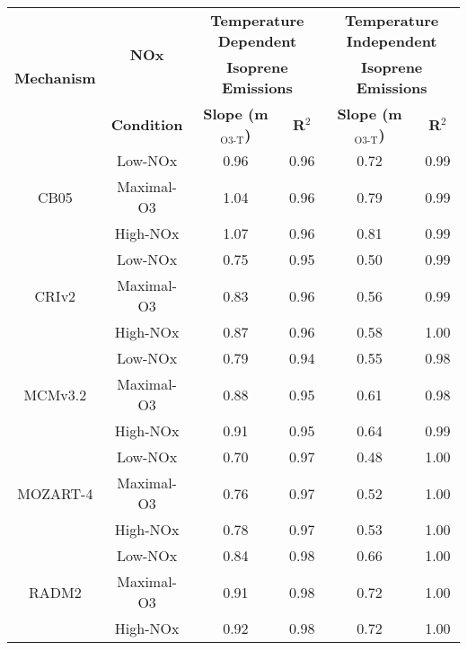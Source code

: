 {\renewcommand{\arraystretch}{1.2}
\begin{tabular}{c|c|c|c|c|c}
	\hline\hline
	\multirow{3}{*}{\textbf{Mechanism}} & \multirow{2}{*}{\textbf{NOx}} & \multicolumn{2}{c|}{\textbf{Temperature Dependent}} & \multicolumn{2}{c}{\textbf{Temperature Independent}} \\ 
	 & & \multicolumn{2}{c|}{\textbf{Isoprene Emissions}} &  \multicolumn{2}{c}{\textbf{Isoprene Emissions}} \\ \cline{3-6} 
	 & \textbf{Condition} & \textbf{Slope (m$_{\text{O3-T}}$)} & \textbf{R$^2$} & \textbf{Slope (m$_{\text{O3-T}}$)} & \textbf{R$^2$} \\ 
	\hline\hline
	\multirow{3}{*}{CB05} & Low-NOx & 0.96 & 0.96 & 0.72 & 0.99 \\ 
	 & Maximal-O3 & 1.04 & 0.96 & 0.79 & 0.99 \\ 
	 & High-NOx & 1.07 & 0.96 & 0.81 & 0.99 \\ 
	\hline
	\multirow{3}{*}{CRIv2} & Low-NOx & 0.75 & 0.95 & 0.50 & 0.99 \\ 
	 & Maximal-O3 & 0.83 & 0.96 & 0.56 & 0.99 \\ 
	 & High-NOx & 0.87 & 0.96 & 0.58 & 1.00 \\ 
	\hline
	\multirow{3}{*}{MCMv3.2} & Low-NOx & 0.79 & 0.94 & 0.55 & 0.98 \\ 
	 & Maximal-O3 & 0.88 & 0.95 & 0.61 & 0.98 \\ 
	 & High-NOx & 0.91 & 0.95 & 0.64 & 0.99 \\ 
	\hline
	\multirow{3}{*}{MOZART-4} & Low-NOx & 0.70 & 0.97 & 0.48 & 1.00 \\ 
	 & Maximal-O3 & 0.76 & 0.97 & 0.52 & 1.00 \\ 
	 & High-NOx & 0.78 & 0.97 & 0.53 & 1.00 \\ 
	\hline
	\multirow{3}{*}{RADM2} & Low-NOx & 0.84 & 0.98 & 0.66 & 1.00 \\ 
	 & Maximal-O3 & 0.91 & 0.98 & 0.72 & 1.00 \\ 
	 & High-NOx & 0.92 & 0.98 & 0.72 & 1.00 \\ 
	\hline
	\hline\hline
\end{tabular}}
